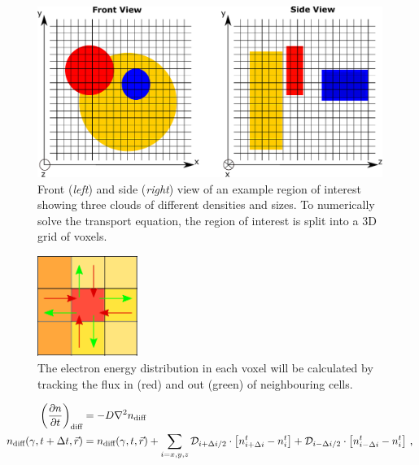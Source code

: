 \begin{figure}[h!]
	\centering
	\includegraphics[width=\textwidth]{09_Multizone/Images/code/cartesian.pdf}
	\caption{Front (\textit{left}) and side (\textit{right}) view of an example region of interest showing three clouds of different densities and sizes. To numerically solve the transport equation, the region of interest is split into a 3D grid of voxels.}
	\label{fig:chapter_8_multizone_cartesian}
\end{figure}
\begin{figure}
	\centering
	\includegraphics[width=0.29\textwidth]{09_Multizone/Images/code/transport.pdf}
	\caption{The electron energy distribution in each voxel will be calculated by tracking the flux in (red) and out (green) of neighbouring cells.}
	\label{eq:09_transport_cells}
\end{figure}
\begin{equation}
    \begin{aligned}
        \qty(\pdv{n}{t})_\text{diff}
        &= -D\nabla^2 n_\text{diff} \\
        n_\text{diff}\qty(\gamma,t+\Delta t,\vec{r})&=n_\text{diff}\qty(\gamma,t,\vec{r})+\sum_{i=x,y,z} \mathcal{D}_{i+\Delta i/2}\cdot
        \qty[n_{i+\Delta i}^{t}
        -n_{i}^t]
        +\mathcal{D}_{i-\Delta i/2}\cdot
        \qty[n_{i-\Delta i}^t
        -n_i^t]\text{ ,}
    \end{aligned} \label{eq:chapter_8_multizone_diff_numerical_sol}
\end{equation}
